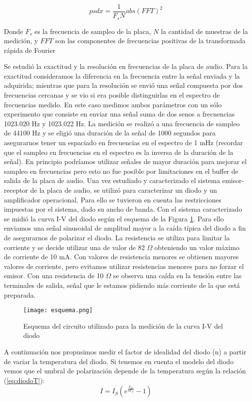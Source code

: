 \documentclass[a4paper, 11pt]{article}
\begin{document}
\begin{equation}\label{eq:psdx}
psdx = \frac{1}{F_sN} abs(FFT)^{2}
\end{equation}

Donde $F_s$ es la frecuencia de sampleo de la placa, $N$ la cantidad de muestras de la medición, y $FFT$ son las componentes de frecuencias positivas de la transformada rápida de Fourier

Se estudió la exactitud y la resolución en frecuencias de la placa de audio. Para la exactitud consideramos la diferencia en la frecuencia entre la señal enviada y la adquirida; mientras que para la resolución se envió una señal compuesta por dos frecuencias cercanas y se vio si era posible distinguirlas en el espectro de frecuencias medido. En este caso medimos ambos parámetros con un sólo experimento que consiste en enviar una señal suma de dos senos a frecuencias 1023.020 Hz y 1023.022 Hz. La medición se realizó a una frecuencia de sampleo de 44100 Hz y se eligió una duración de la señal de 1000 segundos para asegurarnos tener un espaciado en frecuencias en el espectro de 1 mHz (recordar que el sampleo en frecuencias en el espectro es la inversa de la duración de la señal). En principio podríamos utilizar señales de mayor duración para mejorar el sampleo en frecuencias pero esto no fue posible por limitaciones en el buffer de salida de la placa de audio.
Una vez estudiado y caracterizado el sistema emisor-receptor de la placa de audio, se utilizó para caracterizar un diodo y un amplificador operacional. Para ello se tuvieron en cuenta las restricciones impuestas por el sistema, dado su ancho de banda.
Con el sistema caracterizado se midió la curva I-V del diodo según el esquema de la Figura \ref{fig:esquemadiodo}. Para ello enviamos una señal sinusoidal de amplitud mayor a la caída típica del diodo a fin de asegurarnos de polarizar el diodo. La resistencia se utiliza para limitar la corriente y se decide utilizar una de valor de 82 $\Omega$ obteniendo un valor máximo de corriente de 10 mA. Con valores de resistencia menores se obtienen mayores valores de corriente, pero evitamos utilizar resistencias menores para no forzar el emisor. Con una resistencia de 10 $\Omega$ se observa una caída en la tensión entre las terminales de salida, señal que le estamos pidiendo más corriente de la que está preparada.

\begin{figure} [H]
\centering
\texttt{[image: esquema.png]}
\caption{Esquema del circuito utilizado para la medición de la curva I-V del diodo \label{fig:esquemadiodo}}
\end{figure} 
A continuación nos propusimos medir el factor de idealidad  del diodo (n) a partir de variar la temperatura del diodo. Si tenemos en cuenta el modelo del diodo vemos que el umbral de polarización depende de la temperatura según la relación (\ref{eq:diodoT}):
\begin{equation}\label{eq:diodoT}
I=I_S(e^{\frac{V_D}{nV_T}}-1)
\end{equation}
\end{document}
